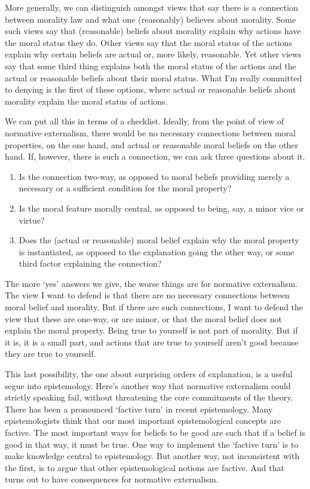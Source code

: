\documentclass[
  10pt,
  letterpaper,
  twoside]{scrbook}
\providecommand{\tightlist}{%
  \setlength{\itemsep}{0pt}\setlength{\parskip}{0pt}}\usepackage{longtable,booktabs,array}
\begin{document}
More generally, we can distinguish amongst views that say there is a
connection between morality law and what one (reasonably) believes about
morality. Some such views say that (reasonable) beliefs about morality
explain why actions have the moral status they do. Other views say that
the moral status of the actions explain why certain beliefs are actual
or, more likely, reasonable. Yet other views say that some third thing
explains both the moral status of the actions and the actual or
reasonable beliefs about their moral status. What I'm really committed
to denying is the first of these options, where actual or reasonable
beliefs about morality explain the moral status of actions.

We can put all this in terms of a checklist. Ideally, from the point of
view of normative externalism, there would be no necessary connections
between moral properties, on the one hand, and actual or reasonable
moral beliefs on the other hand. If, however, there is such a
connection, we can ask three questions about it.

\begin{enumerate}
\def\labelenumi{\arabic{enumi}.}
\tightlist
\item
  Is the connection two-way, as opposed to moral beliefs providing
  merely a necessary or a sufficient condition for the moral property?
\item
  Is the moral feature morally central, as opposed to being, say, a
  minor vice or virtue?
\item
  Does the (actual or reasonable) moral belief explain why the moral
  property is instantiated, as opposed to the explanation going the
  other way, or some third factor explaining the connection?
\end{enumerate}

The more `yes' answers we give, the worse things are for normative
externalism. The view I want to defend is that there are no necessary
connections between moral belief and morality. But if there are such
connections, I want to defend the view that these are one-way, or are
minor, or that the moral belief does not explain the moral property.
Being true to yourself is not part of morality. But if it is, it is a
small part, and actions that are true to yourself aren't good because
they are true to yourself.

This last possibility, the one about surprising orders of explanation,
is a useful segue into epistemology. Here's another way that normative
externalism could strictly speaking fail, without threatening the core
commitments of the theory. There has been a pronounced `factive turn' in
recent epistemology. Many epistemologists think that our most important
epistemological concepts are factive. The most important ways for
beliefs to be good are such that if a belief is good in that way, it
must be true. One way to implement the `factive turn' is to make
knowledge central to epistemology. But another way, not inconsistent
with the first, is to argue that other epistemological notions are
factive. And that turns out to have consequences for normative
externalism.
\end{document}

